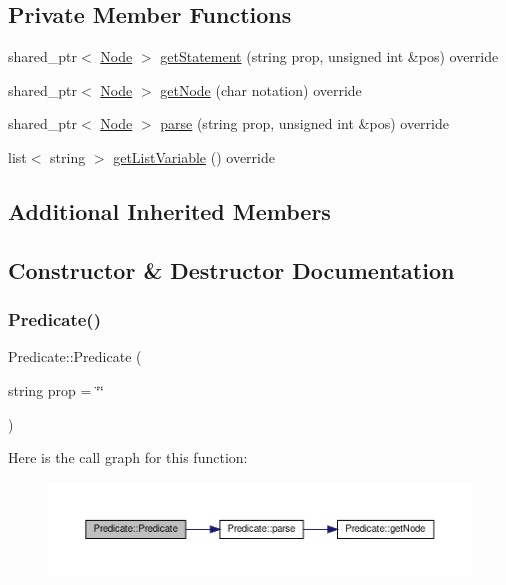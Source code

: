 \subsection*{Private Member Functions}
\begin{DoxyCompactItemize}
\item 
shared\+\_\+ptr$<$ \hyperlink{class_node}{Node} $>$ \hyperlink{class_predicate_a0572df9e18344e95ca1ce521d551a0ea}{get\+Statement} (string prop, unsigned int \&pos) override
\item 
shared\+\_\+ptr$<$ \hyperlink{class_node}{Node} $>$ \hyperlink{class_predicate_a68cb341b481a973037db8d4b369bd73f}{get\+Node} (char notation) override
\item 
shared\+\_\+ptr$<$ \hyperlink{class_node}{Node} $>$ \hyperlink{class_predicate_a5c43d5efe67d0fdeae29ec38267e5acb}{parse} (string prop, unsigned int \&pos) override
\item 
list$<$ string $>$ \hyperlink{class_predicate_ae2524ae4cd1e71a00984f6a49d717469}{get\+List\+Variable} () override
\end{DoxyCompactItemize}
\subsection*{Additional Inherited Members}


\subsection{Constructor \& Destructor Documentation}
\mbox{\label{class_predicate_aae9f9c0874342d8439f6c7ccaa44d76c}} 
\subsubsection{\texorpdfstring{Predicate()}{Predicate()}\hspace{0.1cm}{\footnotesize\ttfamily [1/2]}}
{\footnotesize\ttfamily Predicate\+::\+Predicate (\begin{DoxyParamCaption}\item[{string}]{prop = {\ttfamily \char`\"{}\char`\"{}} }\end{DoxyParamCaption})}

Here is the call graph for this function\+:\nopagebreak
\begin{figure}[H]
\begin{center}
\leavevmode
\includegraphics[width=350pt]{d5/d30/class_predicate_aae9f9c0874342d8439f6c7ccaa44d76c_cgraph}
\end{center}
\end{figure}
\mbox{\label{class_predicate_a0ebfd4d64be4d59053157ca73e7bbd79}} 
